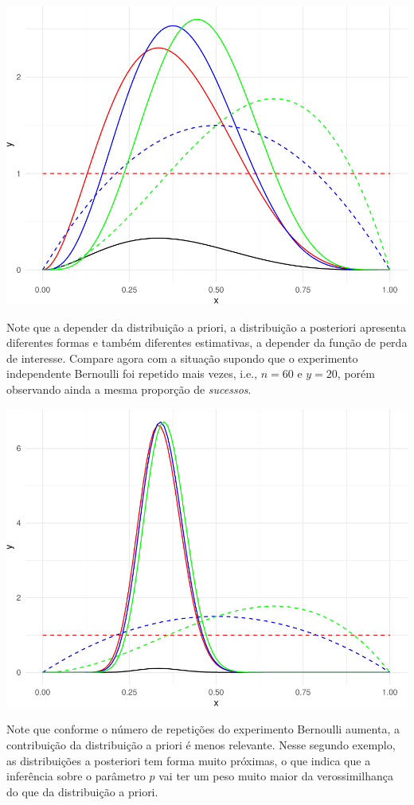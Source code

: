 \documentclass[]{book}
\begin{document}
\begin{center}\includegraphics[width=0.8\linewidth]{notas_livro_files/figure-latex/posteriori_exemplo-1} \end{center}

Note que a depender da distribuição a priori, a distribuição a posteriori apresenta diferentes formas e também diferentes estimativas, a depender da função de perda de interesse. Compare agora com a situação supondo que o experimento independente Bernoulli foi repetido mais vezes, i.e., \(n = 60\) e \(y = 20\), porém observando ainda a mesma proporção de \emph{sucessos}.

\begin{center}\includegraphics[width=0.8\linewidth]{notas_livro_files/figure-latex/posteriori_exemplo2-1} \end{center}

Note que conforme o número de repetições do experimento Bernoulli aumenta, a contribuição da distribuição a priori é menos relevante. Nesse segundo exemplo, as distribuições a posteriori tem forma muito próximas, o que indica que a inferência sobre o parâmetro \(p\) vai ter um peso muito maior da verossimilhança do que da distribuição a priori.
\end{document}
